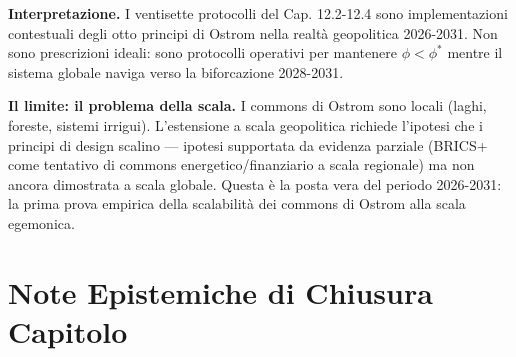 \Proved{} \textbf{Interpretazione.} I ventisette protocolli del Cap.
12.2-12.4 sono implementazioni contestuali degli otto principi di Ostrom
nella realtà geopolitica 2026-2031. Non sono prescrizioni ideali: sono
protocolli operativi per mantenere $\phi < \phi^*$ mentre il sistema
globale naviga verso la biforcazione 2028-2031.

\Hypoth{} \textbf{Il limite: il problema della scala.} I commons di
Ostrom sono locali (laghi, foreste, sistemi irrigui). L'estensione a
scala geopolitica richiede l'ipotesi che i principi di design scalino ---
ipotesi supportata da evidenza parziale (BRICS+ come tentativo di commons
energetico/finanziario a scala regionale) ma non ancora dimostrata a
scala globale. Questa è la posta vera del periodo 2026-2031: la prima
prova empirica della scalabilità dei commons di Ostrom alla scala
egemonica.



\section{Note Epistemiche di Chiusura
Capitolo}\label{note-epistemiche-di-chiusura-capitolo}

